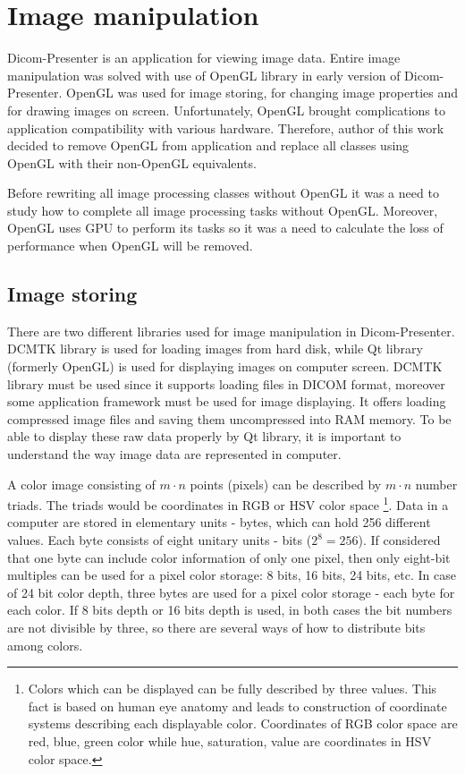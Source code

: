 \chapter{Image manipulation}
\vspace{-10mm}

Dicom-Presenter is an application for viewing image data. Entire image manipulation was solved with use of OpenGL library in early version of Dicom-Presenter. OpenGL was used for image storing, for changing image properties and for drawing images on screen. Unfortunately, OpenGL brought complications to application compatibility with various hardware. Therefore, author of this work decided to remove OpenGL from application and replace all classes using OpenGL with their non-OpenGL equivalents. 

Before rewriting all image processing classes without OpenGL it was a need to study how to complete all image processing tasks without OpenGL. Moreover, OpenGL uses GPU to perform its tasks so it was a need to calculate the loss of performance when OpenGL will be removed. 

\section{Image storing}
\label{rawdata}
There are two different libraries used for image manipulation in Dicom-Presenter. DCMTK library is used for loading images from hard disk, while Qt library (formerly OpenGL) is used for displaying images on computer screen. DCMTK library must be used since it supports loading files in DICOM format, moreover some application framework must be used for image displaying. It offers loading compressed image files and saving them uncompressed into RAM memory. To be able to display these raw data properly by Qt library, it is important to understand the way image data are represented in computer. 

A color image consisting of $m \cdot n$ points (pixels) can be described by $m \cdot n$ number triads. The triads would be coordinates in RGB or HSV color space \footnote{Colors which can be displayed can be fully described by three values. This fact is based on human eye anatomy and leads to construction of coordinate systems describing each displayable color. Coordinates of RGB color space are red, blue, green color while hue, saturation, value are coordinates in HSV color space.}. Data in a computer are stored in elementary units - bytes, which can hold 256 different values. Each byte consists of eight unitary units - bits ($2^8 = 256 $). If considered that one byte can include color information of only one pixel, then only eight-bit multiples can be used for a pixel color storage: 8 bits, 16 bits, 24 bits, etc. In case of 24 bit color depth, three bytes are used for a pixel color storage - each byte for each color. If 8 bits depth or 16 bits depth is used, in both cases the bit numbers are not divisible by three, so there are several ways of how to distribute bits among colors.
 
